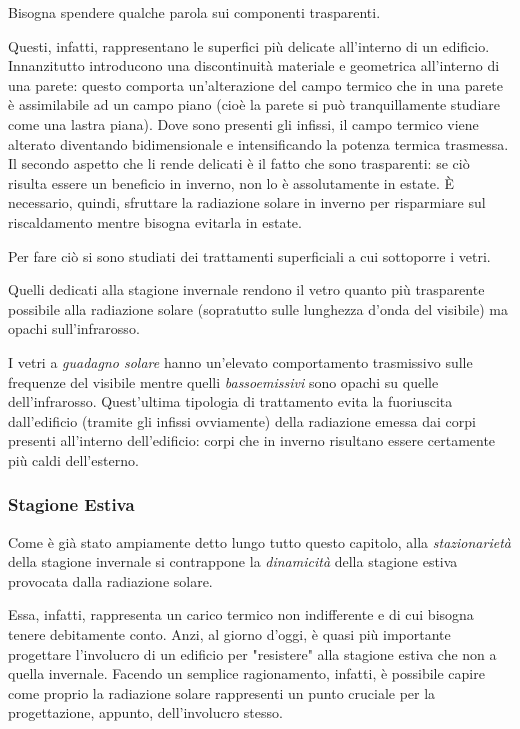 Bisogna spendere qualche parola sui componenti trasparenti.

Questi, infatti, rappresentano le superfici più delicate all'interno di un edificio. Innanzitutto introducono una discontinuità materiale e geometrica all'interno di una parete: questo comporta un'alterazione del campo termico che in una parete è assimilabile ad un campo piano (cioè la parete si può tranquillamente studiare come una lastra piana). Dove sono presenti gli infissi, il campo termico viene alterato diventando bidimensionale e intensificando la potenza termica trasmessa. Il secondo aspetto che li rende delicati è il fatto che sono trasparenti: se ciò risulta essere un beneficio in inverno, non lo è assolutamente in estate. È necessario, quindi, sfruttare la radiazione solare in inverno per risparmiare sul riscaldamento mentre bisogna evitarla in estate.

Per fare ciò si sono studiati dei trattamenti superficiali a cui sottoporre i vetri.

Quelli dedicati alla stagione invernale rendono il vetro quanto più trasparente possibile alla radiazione solare (sopratutto sulle lunghezza d'onda del visibile) ma opachi sull'infrarosso.

I vetri a \emph{guadagno solare} hanno un'elevato comportamento trasmissivo sulle frequenze del visibile mentre quelli \emph{bassoemissivi} sono opachi su quelle dell'infrarosso. Quest'ultima tipologia di trattamento evita la fuoriuscita dall'edificio (tramite gli infissi ovviamente) della radiazione emessa dai corpi presenti all'interno dell'edificio: corpi che in inverno risultano essere certamente più caldi dell'esterno.

\subsubsection{Stagione Estiva}
Come è già stato ampiamente detto lungo tutto questo capitolo, alla \emph{stazionarietà} della stagione invernale si contrappone la \emph{dinamicità} della stagione estiva provocata dalla radiazione solare.

Essa, infatti, rappresenta un carico termico non indifferente e di cui bisogna tenere debitamente conto. Anzi, al giorno d'oggi, è quasi più importante progettare l'involucro di un edificio per "resistere" alla stagione estiva che non a quella invernale. Facendo un semplice ragionamento, infatti, è possibile capire come proprio la radiazione solare rappresenti un punto cruciale per la progettazione, appunto, dell'involucro stesso.


